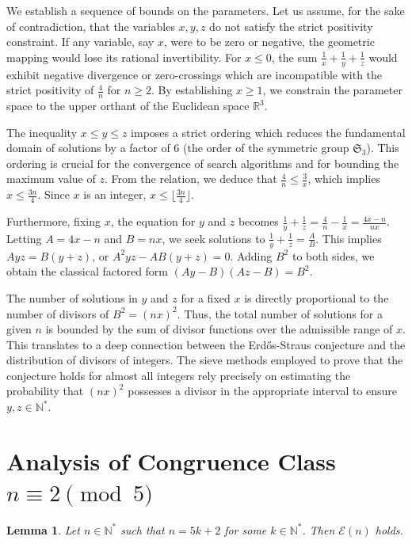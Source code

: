 \documentclass[12pt, a4paper]{article}
\newtheorem{lemma}[theorem]{Lemma}
\theoremstyle{definition}
\theoremstyle{remark}
\begin{document}
We establish a sequence of bounds on the parameters. Let us assume, for the sake of contradiction, that the variables $x, y, z$ do not satisfy the strict positivity constraint. If any variable, say $x$, were to be zero or negative, the geometric mapping would lose its rational invertibility. For $x \le 0$, the sum $\frac{1}{x} + \frac{1}{y} + \frac{1}{z}$ would exhibit negative divergence or zero-crossings which are incompatible with the strict positivity of $\frac{4}{n}$ for $n \ge 2$. By establishing $x \ge 1$, we constrain the parameter space to the upper orthant of the Euclidean space $\mathbb{R}^3$.

The inequality $x \le y \le z$ imposes a strict ordering which reduces the fundamental domain of solutions by a factor of 6 (the order of the symmetric group $\mathfrak{S}_3$). This ordering is crucial for the convergence of search algorithms and for bounding the maximum value of $z$. From the relation, we deduce that $\frac{4}{n} \le \frac{3}{x}$, which implies $x \le \frac{3n}{4}$. Since $x$ is an integer, $x \le \lfloor \frac{3n}{4} \rfloor$.

Furthermore, fixing $x$, the equation for $y$ and $z$ becomes $\frac{1}{y} + \frac{1}{z} = \frac{4}{n} - \frac{1}{x} = \frac{4x - n}{nx}$. Letting $A = 4x - n$ and $B = nx$, we seek solutions to $\frac{1}{y} + \frac{1}{z} = \frac{A}{B}$. This implies $Ayz = B(y+z)$, or $A^2 y z - AB(y+z) = 0$. Adding $B^2$ to both sides, we obtain the classical factored form $(Ay - B)(Az - B) = B^2$.

The number of solutions in $y$ and $z$ for a fixed $x$ is directly proportional to the number of divisors of $B^2 = (nx)^2$. Thus, the total number of solutions for a given $n$ is bounded by the sum of divisor functions over the admissible range of $x$. This translates to a deep connection between the Erd\H{o}s-Straus conjecture and the distribution of divisors of integers. The sieve methods employed to prove that the conjecture holds for almost all integers rely precisely on estimating the probability that $(nx)^2$ possesses a divisor in the appropriate interval to ensure $y, z \in \mathbb{N}^*$.

\section{Analysis of Congruence Class $n \equiv 2 \pmod 5$}

\begin{lemma}
Let $n \in \mathbb{N}^*$ such that $n = 5k + 2$ for some $k \in \mathbb{N}^*$. Then $\mathcal{E}(n)$ holds.
\end{lemma}
\end{document}
